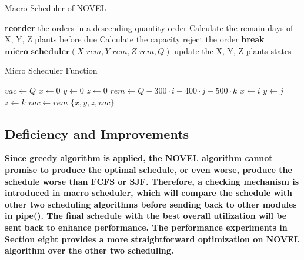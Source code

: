 \documentclass[conference]{IEEEtran}
\begin{document}
\begin{algorithm}
\renewcommand{\thealgorithm}{1} %
\caption{Macro Scheduler of NOVEL} %
\begin{algorithmic}[1] %
    \State \textbf{reorder} the orders in a descending quantity order
        \State Calculate the remain days of X, Y, Z plants before due
        \State Calculate the capacity
            \State reject the order
            \State \textbf{break}
        \EndIf
        \State \(\textbf{micro\_scheduler}(X\_rem, Y\_rem, Z\_rem, Q)\)
        \State update the X, Y, Z plants states
    \EndFor
\end{algorithmic}
\end{algorithm}

\begin{algorithm}
\caption{Micro Scheduler Function}
\begin{algorithmic}[1] %
    \State $vac \gets Q$
    \State $x \gets 0$
    \State $y \gets 0$
    \State $z \gets 0$
                \State $rem \gets Q - 300 \cdot i - 400 \cdot j - 500 \cdot k$
                    \State $x \gets i$
                    \State $y \gets j$
                    \State $z \gets k$
                    \State $vac \gets rem$
                \EndIf
            \EndFor
        \EndFor
    \EndFor
    \State \Return $\{x, y, z, vac\}$
\EndFunction
\end{algorithmic}
\end{algorithm}

\subsection{\textbf{Deficiency and Improvements}}
\textbf{Since greedy algorithm is applied, the NOVEL algorithm cannot promise to produce the optimal schedule, or even worse, produce the schedule worse than FCFS or SJF. Therefore, a checking mechanism is introduced in macro scheduler, which will compare the schedule with other two scheduling algorithms before sending back to other modules in pipe(). The final schedule with the best overall utilization will be sent back to enhance performance. The performance experiments in Section eight provides a more straightforward optimization on NOVEL algorithm over the other two scheduling.
}
\end{document}
